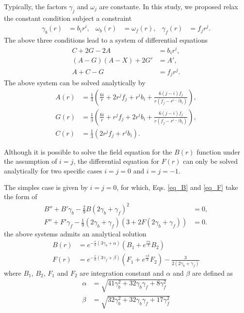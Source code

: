 \documentclass{article}
\begin{document}
Typically, the factors $\gamma_j$ and $\omega_j$ are constante. In this study, we proposed
relax the constant condition subject a constraint
\begin{align}
    \gamma_b(r) & = b_ir^{i}, & \omega_b(r) & = \omega_f(r), & \gamma_f(r) & = f_jr^{j}.
\end{align}
The above three conditions lead to a system of differential equations
\begin{align}
    C + 2G - 2A & = b_ir^{i}, \\
    \left(A - G\right)\left(A - X\right) + 2G' & = A',\\
    A + C - G & = f_jr^{j}.
\end{align}
The above system can be solved analytically by
\begin{align}
    A(r) & = \frac{1}{3}\left(\frac{6i}{r} + 2r^{j}f_j + r^{i}b_i + \frac{6\left(j - i\right)f_j}{r\left(f_j - r^{i - j}b_i\right)}\right), \\
    G(r) & = \frac{1}{3}\left(\frac{6i}{r} + r^{j}f_j + 2r^{i}b_i + \frac{6\left(j - i\right)f_j}{r\left(f_j - r^{i - j}b_i\right)}\right), \\
    C(r) & = \frac{1}{3}\left(2r^{j}f_j + r^{i}b_i\right).
\end{align}

Although it is possible to solve the field equation for the $B(r)$ function under the
assumption of $i = j$, the differential equation for $F(r)$ can only be solved analytically
for two specific cases $i = j = 0$ and $i = j = -1$. 

The simples case is given by $i = j = 0$, for which, Eqs. \eqref{eq_B} and \eqref{eq_F} take the form
of
\begin{align}
    B'' + B'\gamma_b - \frac{2}{9}B\left(2\gamma_b + \gamma_f\right)^2 & = 0, \\ 
    F'' + F'\gamma_f - \frac{1}{9}\left(2\gamma_b + \gamma_f\right)\left(3 + 2F\left(2\gamma_b + \gamma_f\right)\right) & = 0.
\end{align}
the above systems admits an analytical solution
\begin{align}
    B(r) & = e^{-\frac{r}{6}\left(3\gamma_b + \alpha\right)}\left(B_1 + e^{\frac{r\alpha}{3}}B_2\right) \\
    F(r) & = e^{-\frac{r}{6}\left(3\gamma_f + \beta\right)}\left(F_1 + e^{\frac{r\beta}{3}}F_2\right) - \frac{3}{2\left(2\gamma_b + \gamma_f\right)}
\end{align}
where $B_1$, $B_2$, $F_1$ and $F_2$ are integration constant and $\alpha$ and $\beta$ are defined as 
\begin{align}
    \alpha & = \sqrt{41\gamma_b^2 + 32\gamma_b\gamma_f + 8\gamma_f^2} \\
    \beta  & = \sqrt{32\gamma_b^2 + 32\gamma_b\gamma_f + 17\gamma_f^2} 
\end{align}
\end{document}
